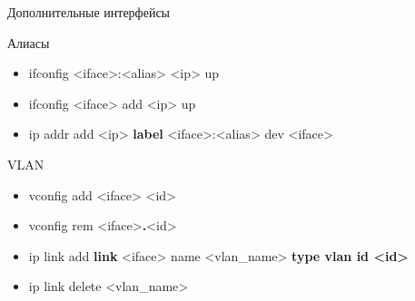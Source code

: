 \begin{frame}{Дополнительные интерфейсы}
	\begin{block}{Алиасы}
		\begin{itemize}
			\item ifconfig <iface>:<alias> <ip> up
			\item ifconfig <iface> add <ip> up
			\item ip addr add <ip> {\bf label} <iface>:<alias> dev <iface>
		\end{itemize}
	\end{block}
	\pause
	\begin{block}{VLAN}
		\begin{itemize}
			\item vconfig add <iface> <id>
			\item vconfig rem <iface>{\bf.}<id>
			\item ip link add {\bf link} <iface> name <vlan\_name> {\bf type vlan id <id>}
			\item ip link delete <vlan\_name>
		\end{itemize}
	\end{block}

\end{frame}



